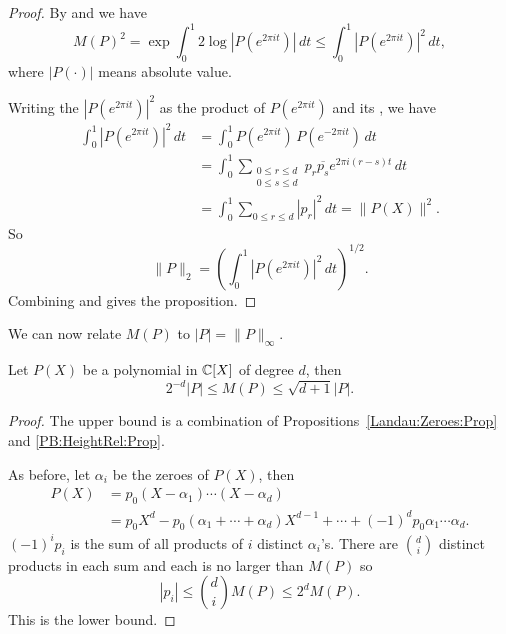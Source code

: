 \begin{proof}
By  and  we have
\begin{equation}\label{PB:Landau:Eqa}
M(P)^2 = \exp \int_0^1 2 \log|P(e^{2\pi i t})| \,dt
\le \int_0^1 |P(e^{2\pi i t})|^2 \,dt,
\end{equation}
where $|P(\cdot)|$ means absolute value.

Writing the $|P(e^{2\pi i t})|^{2}$ as the product of $P(e^{2\pi i
t})$ and its , we have
\[
\begin{aligned}
  \int_{0}^{1} \left| P(e^{2\pi i t})\right|^{2} \,dt
     & = \int_{0}^{1} P(e^{2\pi i t})\,P(e^{-2\pi i t}) \, dt\\
 & = \int_{0}^{1} 
       \sum_{\substack{0\le r \le d  \\ 0 \le s \le d}} 
          p_{r} \overline{p_{s}} e^{2\pi i (r-s) t}
       \,dt\\
 & = \int_{0}^{1} \sum_{0 \le r \le d} \left| p_{r} \right|^{2} \, dt 
 = \| P(X) \|^{2}.
\end{aligned}
\]
So
\begin{equation} \label{PB:Landau:Eqb}
\|P\|_{2} 
 = \left( \int_{0}^{1} \left| P(e^{2\pi i t})\right|^{2} \,dt \right)^{1/2}.
\end{equation}
Combining  and  gives the 
proposition.
\end{proof}

We can now relate $M(P)$ to $|P| = \|P\|_{\infty}$.

\begin{proposition} \label{Uni:Coef:MP:Prop}
Let $P(X)$ be a polynomial in $\mathbb{C}[X]$ of degree $d$, then
\[
2^{-d} |P| \le M(P) \le \sqrt{d+1} |P|.
\]
\end{proposition}

\begin{proof}
The upper bound is a combination of Propositions~\ref{Landau:Zeroes:Prop} and
\ref{PB:HeightRel:Prop}. 

As before, let $\alpha_{i}$ be the zeroes of $P(X)$, then
\[
\begin {aligned}
P(X) & = p_0 (X - \alpha_{1}) \cdots (X - \alpha_{d}) \\
 & = p_0 X^{d} - p_0(\alpha_{1} + \cdots + \alpha_{d}) X^{d-1} + 
\cdots + (-1)^{d} p_0 \alpha_{1} \cdots \alpha_{d}.
\end{aligned}
\]
$(-1) ^{i} p_{i}$ is the sum of all products of $i$ distinct
$\alpha_{i}$'s.  There are $\binom{d}{i}$ distinct products in each sum
and each is no larger than $M(P)$ so
\begin{equation}\label{CoefZ:Bound:Eq}
\left| p_{i} \right| \le \binom{d}{i} M(P)
 \le 2^{d} M(P).
\end{equation}
This is the lower bound.
\end{proof}

